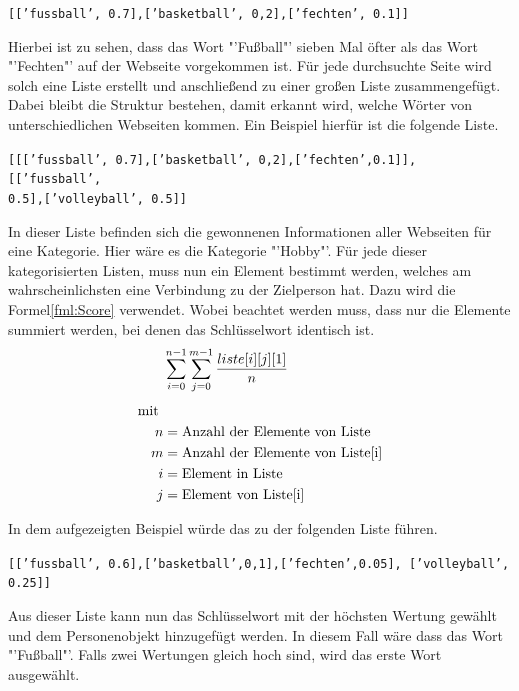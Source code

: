 	\texttt{[['fussball', 0.7],['basketball', 0,2],['fechten', 0.1]]}
	
	Hierbei ist zu sehen, dass das Wort "'Fußball"' sieben Mal öfter als das Wort "'Fechten"' auf der Webseite vorgekommen ist. Für jede durchsuchte Seite wird solch eine Liste erstellt und anschließend zu einer großen Liste zusammengefügt. Dabei bleibt die Struktur bestehen, damit erkannt wird, welche Wörter von unterschiedlichen Webseiten kommen. Ein Beispiel hierfür ist die folgende Liste.
	
	\texttt{[[['fussball', 0.7],['basketball', 0,2],['fechten',0.1]],
		[['fussball',\\ 0.5],['volleyball', 0.5]]}
	
	In dieser Liste befinden sich die gewonnenen Informationen aller Webseiten für eine Kategorie. Hier wäre es die Kategorie "'Hobby"'. Für jede dieser kategorisierten Listen, muss nun ein Element bestimmt werden, welches am wahrscheinlichsten eine Verbindung zu der Zielperson hat. Dazu wird die Formel\ref{fml:Score} verwendet. Wobei beachtet werden muss, dass nur die Elemente summiert werden, bei denen das Schlüsselwort identisch ist.
	\begin{align}%
	\label{fml:Score}
	\begin{split}%
	&\sum\limits_{i=0}^{n-1}\sum\limits_{j=0}^{m-1} \frac{liste[i][j][1]}{n}\\[0.25\baselineskip]%
	\text{mit } \\
	n &= \text{Anzahl der Elemente von Liste}\\
	m &= \text{Anzahl der Elemente von Liste[i]}\\
	i &= \text{Element in Liste}\\             %
	j &= \text{Element von Liste[i]}
	\end{split}
	\end{align}
	
	In dem aufgezeigten Beispiel würde das zu der folgenden Liste führen.
	
	\texttt{[['fussball', 0.6],['basketball',0,1],['fechten',0.05],
		['volleyball', 0.25]]}
	
	Aus dieser Liste kann nun das Schlüsselwort mit der höchsten Wertung gewählt und dem Personenobjekt hinzugefügt werden. In diesem Fall wäre dass das Wort "'Fußball"'. Falls zwei Wertungen gleich hoch sind, wird das erste Wort ausgewählt.
	
